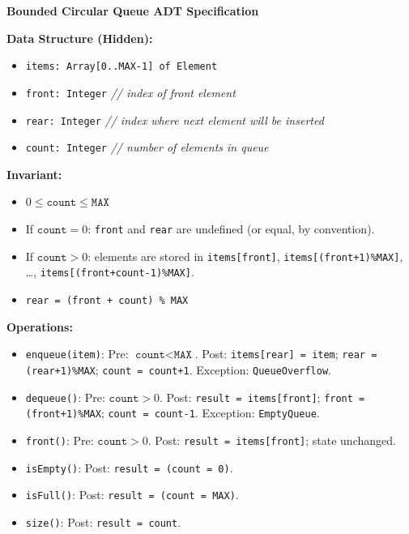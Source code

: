 \documentclass[11pt]{article}
\begin{document}
\begin{corrige}[Exercise 1]
\textbf{Bounded Circular Queue ADT Specification}

\textbf{Data Structure (Hidden):}
\begin{itemize}
    \item \texttt{items: Array[0..MAX-1] of Element}
    \item \texttt{front: Integer} \quad \textit{// index of front element}
    \item \texttt{rear: Integer} \quad \textit{// index where next element will be inserted}
    \item \texttt{count: Integer} \quad \textit{// number of elements in queue}
\end{itemize}

\textbf{Invariant:}
\begin{itemize}
    \item $0 \le \texttt{count} \le \texttt{MAX}$
    \item If $\texttt{count} = 0$: \texttt{front} and \texttt{rear} are undefined (or equal, by convention).
    \item If $\texttt{count} > 0$: elements are stored in \texttt{items[front]}, \texttt{items[(front+1)\%MAX]}, \dots, \texttt{items[(front+count-1)\%MAX]}.
    \item \texttt{rear = (front + count) \% MAX}
\end{itemize}

\textbf{Operations:}
\begin{itemize}
    \item \texttt{enqueue(item)}: Pre: $\texttt{count} < \texttt{MAX}$. Post: \texttt{items[rear] = item}; \texttt{rear = (rear+1)\%MAX}; \texttt{count = count+1}. Exception: \texttt{QueueOverflow}.
    \item \texttt{dequeue()}: Pre: $\texttt{count} > 0$. Post: \texttt{result = items[front]}; \texttt{front = (front+1)\%MAX}; \texttt{count = count-1}. Exception: \texttt{EmptyQueue}.
    \item \texttt{front()}: Pre: $\texttt{count} > 0$. Post: \texttt{result = items[front]}; state unchanged.
    \item \texttt{isEmpty()}: Post: \texttt{result = (count = 0)}.
    \item \texttt{isFull()}: Post: \texttt{result = (count = MAX)}.
    \item \texttt{size()}: Post: \texttt{result = count}.
\end{itemize}
\end{corrige}
\end{document}
